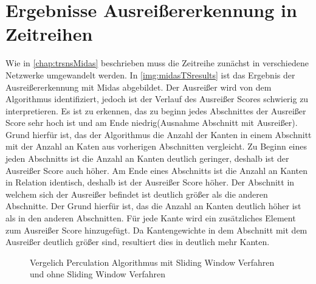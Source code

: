 \section{Ergebnisse Ausreißererkennung in Zeitreihen}
Wie in \autoref{chap:trsnsMidas} beschrieben muss die Zeitreihe zunächst in verschiedene Netzwerke umgewandelt werden. In \autoref{img:midasTSresults} ist das Ergebnis der Ausreißererkennung mit Midas abgebildet. Der Ausreißer wird von dem Algorithmus identifiziert, jedoch ist der Verlauf des Ausreißer Scores schwierig zu interpretieren. Es ist zu erkennen, das zu beginn jedes Abschnittes der Ausreißer Score sehr hoch ist und am Ende niedrig(Ausnahme Abschnitt mit Ausreißer). Grund hierfür ist, das der Algorithmus die Anzahl der Kanten in einem Abschnitt mit der Anzahl an Katen aus vorherigen Abschnitten vergleicht. Zu Beginn eines jeden Abschnitts ist die Anzahl an Kanten deutlich geringer, deshalb ist der Ausreißer Score auch höher. Am Ende eines Abschnitts ist die Anzahl an Kanten in Relation identisch, deshalb ist der Ausreißer Score höher. Der Abschnitt in welchem sich der Ausreißer befindet ist deutlich größer als die anderen Abschnitte. Der Grund hierfür ist, das die Anzahl an Kanten deutlich höher ist als in den anderen Abschnitten. Für jede Kante wird ein zusätzliches Element zum Ausreißer Score hinzugefügt. Da Kantengewichte in dem Abschnitt mit dem Ausreißer deutlich größer sind, resultiert dies in deutlich mehr Kanten. 
\label{sec:resultsOTs}

\begin{figure}[h]
	\centering
	\caption{Vergelich Perculation Algorithmus mit Sliding Window Verfahren und ohne Sliding Window Verfahren}
	\label{img:midasTSresults}
\end{figure}

